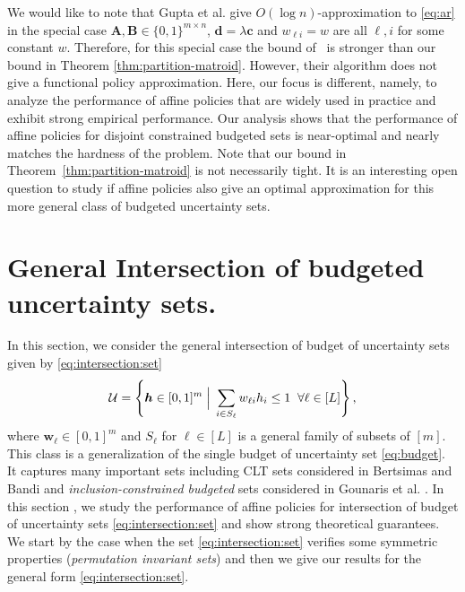 \documentclass[moor]{informs1}              %
\newcommand{\mb}[1]{\ensuremath{\boldsymbol{#1}}}
\begin{document}
We would like to note that Gupta et al. \cite{gupta2016robust} give $O(\log n)$-approximation to \eqref{eq:ar} in the special case $\mb A, \mb B \in \{0,1\}^{m \times n}$, $ \mb d = \lambda \mb c$ and $w_{\ell i} = w$ are all $\ell, i$ for some constant $w$. Therefore, for this special case the bound of~\cite{gupta2016robust} is stronger than our bound in Theorem \ref{thm:partition-matroid}. However, their algorithm does not give a functional policy approximation. Here, our focus is different, namely, to analyze the performance of affine policies that are widely used in practice and exhibit strong empirical performance. Our analysis shows that the performance of affine policies for disjoint constrained budgeted sets is near-optimal and nearly matches the hardness of the problem. Note that our bound in Theorem~\ref{thm:partition-matroid} is not necessarily tight. It is an interesting open question to study if affine policies also give an optimal approximation for this more general class of budgeted uncertainty sets.

\section{General Intersection of budgeted  uncertainty sets.}
In this section, we consider the general intersection of budget of uncertainty sets given by \eqref{eq:intersection:set}
$${\cal U} = \left\{ \mb h \in [0,1]^m  \; \Big\vert \;   \sum_{ i \in S_{\ell}} w_{\ell i} h_i \leq 1 \;\;  \forall \ell \in [L] \right\},$$
where $  \mb w_{\ell} \in [0,1]^m$ and $S_{\ell}$ for $\ell \in [L]$ is a general family of subsets of $[m]$. This class is a generalization of the single budget of uncertainty set \eqref{eq:budget}. It captures many important sets including CLT sets considered in Bertsimas and Bandi \cite{bandi2012tractable} and {\em inclusion-constrained budgeted} sets considered in Gounaris et al. \cite{gounaris2014adaptive}. In this section , we study the performance of affine policies for intersection of budget of uncertainty sets \eqref{eq:intersection:set} and show strong theoretical guarantees. We start by the case when the set \eqref{eq:intersection:set} verifies some symmetric properties ({\em permutation invariant sets}) and then we give our results for the general form \eqref{eq:intersection:set}.
\end{document}
